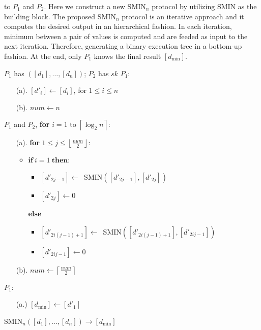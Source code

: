 \documentclass{article}
\begin{document}
to $P_1$ and $P_2$. Here we construct a new SMIN$_n$ protocol by utilizing SMIN  as 
the building block. The proposed SMIN$_n$ protocol is an iterative approach and it computes the desired 
output in an hierarchical fashion. In each iteration, minimum between a pair of values is computed and are 
feeded as input to the next iteration. Therefore, generating a binary execution 
tree in a bottom-up fashion. At the end, only $P_1$ knows the final result $[d_{\min}]$.  
\begin{algorithm}[t]
\begin{algorithmic}[1]
\REQUIRE $P_1$ has $([d_1], \ldots, [d_n])$; $P_2$ has $sk$
\STATE $P_1$: 
\begin{enumerate}\itemsep=0pt
  \item[(a).] $[d'_i] \gets [d_i]$, for $1 \le i \le n$
  \item[(b).] $num \gets n$
\end{enumerate}    
\STATE $P_1$ and $P_2$, \textbf{for} $i=1$ to $\left \lceil \log_2 n \right \rceil$:
\begin{enumerate}\itemsep=0pt
    \item[(a).] \textbf{for} $1 \leq j \leq \left \lfloor \frac{num}{2} \right \rfloor$: 
              \begin{itemize}
               \item $\textbf{if}~i = 1 ~\textbf{then}$: 
                             \begin{itemize}\itemsep=2pt
                                 \item $[d'_{2j-1}] \gets$~SMIN$([d'_{2j -1}], [d'_{2j}])$
                                 \item $[d'_{2j}] \gets 0$  
                             \end{itemize} 
                      \textbf{else}
                            \begin{itemize}\itemsep=2pt
                                 \item $[d'_{2i(j-1)+1}] \gets$~SMIN$([d'_{2i(j-1)+1}], [d'_{2ij-1}])$
                                  \item $[d'_{2ij-1}] \gets 0$ 
                            \end{itemize} 
                                                                  
                 \end{itemize}               
    \item[(b).]  $num \gets  \left \lceil \frac{num}{2} \right \rceil$
\end{enumerate}
\STATE $P_1$:
\begin{enumerate}\itemsep=2pt
    \item[(a.)] $ [d_{\min}] \gets [d'_1]$
\end{enumerate}
\end{algorithmic}
\caption{SMIN$_n([d_1],\ldots, [d_n]) \rightarrow [d_{\min}]$}
\label{alg:smkn}
\end{algorithm}
\end{document}
